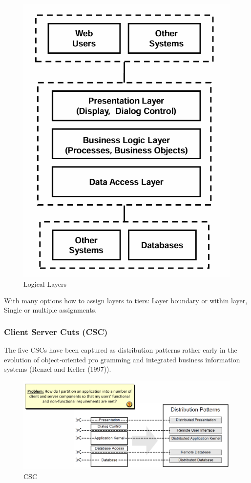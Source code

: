 \documentclass[../Main.tex]{subfiles}
\begin{document}

\begin{figure}[H]
    \centering
    \includegraphics[width=0.5\linewidth]{Images/logicallayer.png}
    \caption{Logical Layers}
\end{figure}

With many options how to assign layers to tiers: Layer boundary or
within layer,  Single or multiple assignments.

\subsubsection{Client Server Cuts (CSC)}
The five CSCs have been captured as distribution patterns 
rather early in the evolution of object‑oriented pro gramming
and integrated business information systems (Renzel and Keller (1997)).
\begin{figure}[H]
    \centering
    \includegraphics[width=1\linewidth]{Images/csc.png}
    \caption{CSC}
\end{figure}
\end{document}
